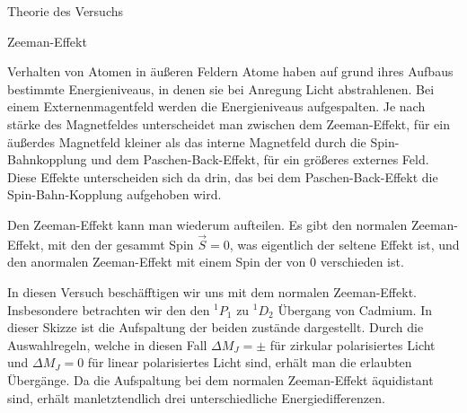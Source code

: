\documentclass[pdftex, a4paper,11pt, twoside, ngerman]{report}
\begin{document}
  \begin{chapter}{Theorie des Versuchs}
    \label{chp:Theorie}
    
    
    
    \begin{section}{Zeeman-Effekt}
      
      \begin{subsection}{Verhalten von Atomen in äußeren Feldern}
        Atome haben auf grund ihres Aufbaus bestimmte Energieniveaus,
        in denen sie bei Anregung Licht abstrahlenen. 
        Bei einem Externenmagentfeld werden die Energieniveaus aufgespalten. 
        Je nach stärke des Magnetfeldes unterscheidet man zwischen dem
        Zeeman-Effekt, für ein äußerdes Magnetfeld kleiner als das interne
        Magnetfeld durch die Spin-Bahnkopplung und dem Paschen-Back-Effekt,
        für ein größeres externes Feld. Diese Effekte unterscheiden sich da
        drin, das bei dem Paschen-Back-Effekt die Spin-Bahn-Kopplung aufgehoben wird.

        Den Zeeman-Effekt kann man wiederum aufteilen.
        Es gibt den normalen Zeeman-Effekt, mit den der gesammt Spin $\vec S = 0$, was eigentlich der seltene Effekt ist, und den anormalen Zeeman-Effekt mit einem Spin der von 0 verschieden ist.

        In diesen Versuch beschäfftigen wir uns mit dem normalen Zeeman-Effekt.
        Insbesondere betrachten wir den den ${}^1P_1$ zu ${}^1D_2$ Übergang von Cadmium.
        In dieser Skizze ist die Aufspaltung der beiden zustände dargestellt.
        Durch die Auswahlregeln, welche in diesen Fall $\Delta M_J = \pm$ für zirkular polarisiertes Licht und $\Delta M_J=0$ für linear polarisiertes Licht sind, erhält man die erlaubten Übergänge.
        Da die Aufspaltung bei dem normalen Zeeman-Effekt äquidistant sind, erhält manletztendlich drei unterschiedliche Energiedifferenzen.
        

\end{subsection}
\end{section}
\end{chapter}
\end{document}
